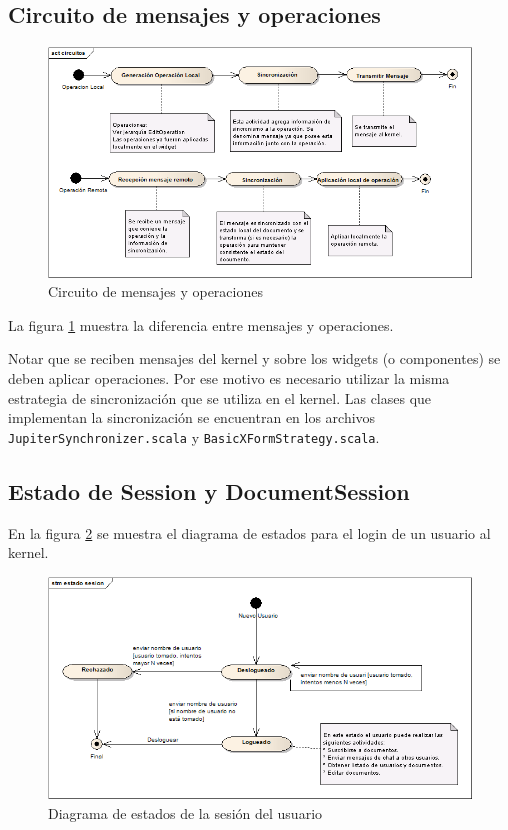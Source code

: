 \documentclass[12pt,a4paper]{article}
\begin{document}
\subsection{Circuito de mensajes y operaciones}

	\begin{figure}[!ht]
		\begin{center}
			\includegraphics[width=14cm]{circuitos-mensajes.png}
			\caption{\label{circuitos-mensajes} Circuito de mensajes y operaciones }
		\end{center}
	\end{figure}


La figura \ref{circuitos-mensajes} muestra la diferencia entre mensajes y operaciones.

Notar que se reciben mensajes del kernel y sobre los widgets (o componentes) se deben aplicar operaciones. Por ese motivo es necesario 
utilizar la misma estrategia de sincronización que se utiliza en el kernel. Las clases que implementan la sincronización se 
encuentran en los archivos \\ 
\texttt{JupiterSynchronizer.scala} y \texttt{BasicXFormStrategy.scala}.

\subsection{Estado de Session y DocumentSession}

En la figura \ref{estado-sesion} se muestra el diagrama de estados para el login de un usuario al kernel.

	\begin{figure}[!ht]
		\begin{center}
			\includegraphics[width=14cm]{estado-sesion.png}
			\caption{\label{estado-sesion} Diagrama de estados de la sesión del usuario }
		\end{center}
	\end{figure}
\end{document}
